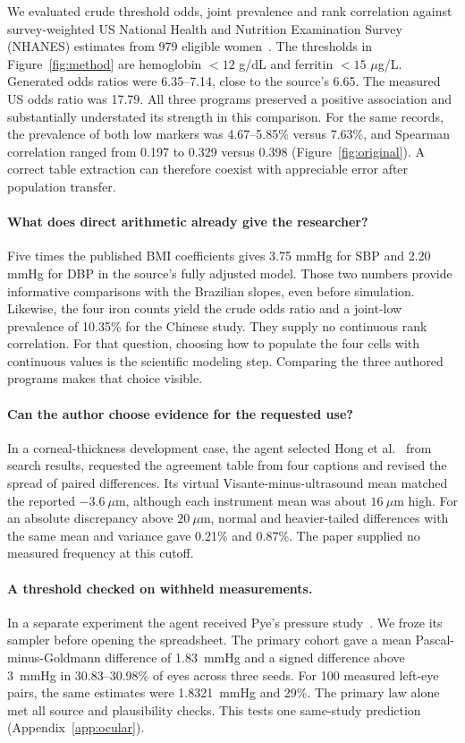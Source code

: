 \documentclass[sigconf,anonymous,review]{acmart}
\begin{document}
We evaluated crude threshold odds, joint prevalence and rank correlation against survey-weighted US National Health and Nutrition Examination Survey (NHANES) estimates from 979 eligible women~\cite{nhanes}. The thresholds in Figure~\ref{fig:method} are hemoglobin $<12$ g/dL and ferritin $<15$ $\mu$g/L. Generated odds ratios were 6.35--7.14, close to the source's 6.65. The measured US odds ratio was 17.79. All three programs preserved a positive association and substantially understated its strength in this comparison. For the same records, the prevalence of both low markers was 4.67--5.85\% versus 7.63\%, and Spearman correlation ranged from 0.197 to 0.329 versus 0.398 (Figure~\ref{fig:original}). A correct table extraction can therefore coexist with appreciable error after population transfer.

\paragraph{What does direct arithmetic already give the researcher?}
Five times the published BMI coefficients gives 3.75 mmHg for SBP and 2.20 mmHg for DBP in the source's fully adjusted model. Those two numbers provide informative comparisons with the Brazilian slopes, even before simulation. Likewise, the four iron counts yield the crude odds ratio and a joint-low prevalence of 10.35\% for the Chinese study. They supply no continuous rank correlation. For that question, choosing how to populate the four cells with continuous values is the scientific modeling step. Comparing the three authored programs makes that choice visible.

\paragraph{Can the author choose evidence for the requested use?}
In a corneal-thickness development case, the agent selected Hong et al.~\cite{hongpachymetry} from search results, requested the agreement table from four captions and revised the spread of paired differences. Its virtual Visante-minus-ultrasound mean matched the reported $-3.6~\mu$m, although each instrument mean was about $16~\mu$m high. For an absolute discrepancy above $20~\mu$m, normal and heavier-tailed differences with the same mean and variance gave 0.21\% and 0.87\%. The paper supplied no measured frequency at this cutoff.

\paragraph{A threshold checked on withheld measurements.}
In a separate experiment the agent received Pye's pressure study~\cite{pyeiop}. We froze its sampler before opening the spreadsheet. The primary cohort gave a mean Pascal-minus-Goldmann difference of 1.83~mmHg and a signed difference above 3~mmHg in 30.83--30.98\% of eyes across three seeds. For 100 measured left-eye pairs, the same estimates were 1.8321~mmHg and 29\%. The primary law alone met all source and plausibility checks. This tests one same-study prediction (Appendix~\ref{app:ocular}).
\end{document}
